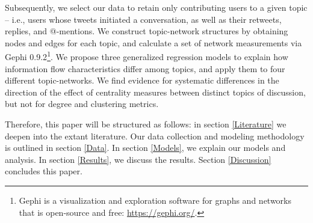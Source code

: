 Subsequently, we select our data to retain only contributing users to a given topic – i.e., users whose tweets initiated a conversation, as well as their retweets, replies, and @-mentions. We construct topic-network structures by obtaining nodes and edges for each topic, and calculate a set of network measurements via Gephi 0.9.2\footnote{Gephi is a visualization and exploration software for graphs and networks that is open-source and free: \url{https://gephi.org/}.}. We propose three generalized regression models to explain how information flow characteristics differ among topics, and apply them to four different topic-networks. We find evidence for systematic differences in the direction of the effect of centrality measures between distinct topics of discussion, but not for degree and clustering metrics.

Therefore, this paper will be structured as follows: in section \ref{Literature} we deepen into the extant literature. Our data collection and modeling methodology is outlined in section \ref{Data}. In section \ref{Models}, we explain our models and analysis. In section \ref{Results}, we discuss the results. Section \ref{Discussion} concludes this paper.
